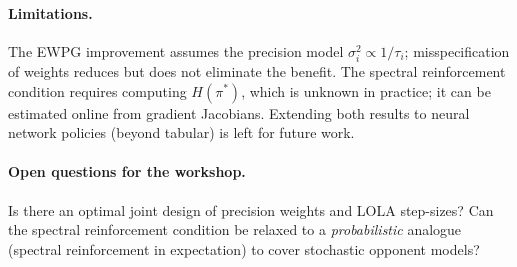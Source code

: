 \documentclass[10pt,letterpaper]{article}
\begin{document}
\paragraph{Limitations.}
The EWPG improvement assumes the precision model $\sigma_i^2 \propto 1/\tau_i$;
misspecification of weights reduces but does not eliminate the benefit.
The spectral reinforcement condition requires computing $H(\pi^*)$,
which is unknown in practice; it can be estimated online from gradient
Jacobians. Extending both results to neural network policies (beyond
tabular) is left for future work.

\paragraph{Open questions for the workshop.}
Is there an optimal joint design of precision weights and LOLA
step-sizes? Can the spectral reinforcement condition be relaxed to
a \emph{probabilistic} analogue (spectral reinforcement in
expectation) to cover stochastic opponent models?



\end{document}

